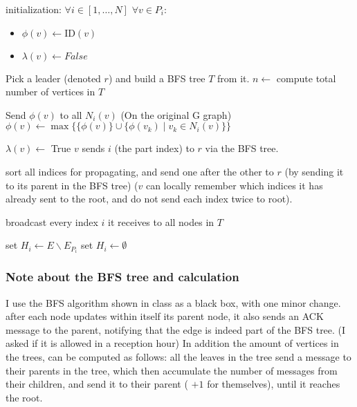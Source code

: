 \documentclass[11pt]{article}
\begin{document}
\begin{algorithmic}[1]
\State initialization: $\forall i \in [1,\dots, N]$ $\forall v \in P_i$:
\begin{itemize}
    \item $\phi(v) \leftarrow \text{ID}(v)$
    \item $\lambda(v) \leftarrow False$
\end{itemize}

\State Pick a leader (denoted $r$) and build a BFS tree $T$ from it.
\State $n \leftarrow$ compute total number of vertices in $T$


\State Send $\phi(v)$ to all $N_i(v)$ (On the original G graph)
\State $\phi(v) \leftarrow \max \{ \{ \phi(v) \} \cup \{  { \phi(v_k) \mid v_k \in N_i(v)} \} \}$

    \State $\lambda(v) \leftarrow $ True
    \State $v$ sends $i$ (the part index) to $r$ via the BFS tree.
\EndIf
\EndFor


    \State sort all indices for propagating, and send one after the other to $r$ (by sending it to its parent in the BFS tree) ($v$ can locally remember which indices it has already sent to the root, and do not send each index twice to root).
\EndIf 

    \State broadcast every index $i$ it receives to all nodes in $T$
\EndIf 

    \State set $H_i  \leftarrow E \backslash E_{P_{i}}$
\Else
    \State set $H_i \leftarrow \emptyset$
\EndIf

\end{algorithmic}

\subsubsection*{Note about the BFS tree and calculation}
I use the BFS algorithm shown in class as a black box, with one minor change. after each node updates within itself its parent node, it also sends an ACK message to the parent, notifying that the edge is indeed part of the BFS tree. (I asked if it is allowed in a reception hour)
In addition the amount of vertices in the trees, can be computed as follows: all the leaves in the tree send a message to their parents in the tree, which then accumulate the number of messages from their children, and send it to their parent ( $+1$ for themselves), until it reaches the root.
\end{document}
